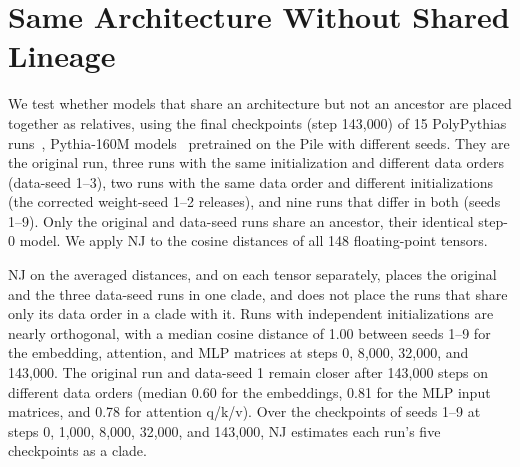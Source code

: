 \documentclass{article}
\theoremstyle{definition}
\theoremstyle{plain}
\newif\ifrevision
\newcommand{\rev}[1]{\ifrevision{\color{blue}#1}\else#1\fi}
\newcommand{\revcolor}{\ifrevision\color{blue}\fi}
\newcommand{\revtag}[1]{\ifrevision\textsuperscript{\color{blue}\sffamily\scriptsize[#1]}\fi}
\begin{document}
\section{\rev{Same Architecture Without Shared Lineage}}
\label{app:pythia}
{\revcolor
\revtag{qfLP}We test whether models that share an architecture but not an ancestor are placed together as relatives, using the final checkpoints (step 143{,}000) of 15 PolyPythias runs~\citep{vanderwal2025polypythias}, Pythia-160M models~\citep{biderman2023pythia} pretrained on the Pile with different seeds. They are the original run, three runs with the same initialization and different data orders (data-seed 1--3), two runs with the same data order and different initializations (the corrected weight-seed 1--2 releases), and nine runs that differ in both (seeds 1--9). Only the original and data-seed runs share an ancestor, their identical step-0 model. We apply NJ to the cosine distances of all 148 floating-point tensors.

NJ on the averaged distances, and on each tensor separately, places the original and the three data-seed runs in one clade, and does not place the runs that share only its data order in a clade with it. Runs with independent initializations are nearly orthogonal, with a median cosine distance of 1.00 between seeds 1--9 for the embedding, attention, and MLP matrices at steps 0, 8{,}000, 32{,}000, and 143{,}000. The original run and data-seed 1 remain closer after 143{,}000 steps on different data orders (median 0.60 for the embeddings, 0.81 for the MLP input matrices, and 0.78 for attention q/k/v). Over the checkpoints of seeds 1--9 at steps 0, 1{,}000, 8{,}000, 32{,}000, and 143{,}000, NJ estimates each run's five checkpoints as a clade.
}
\end{document}
